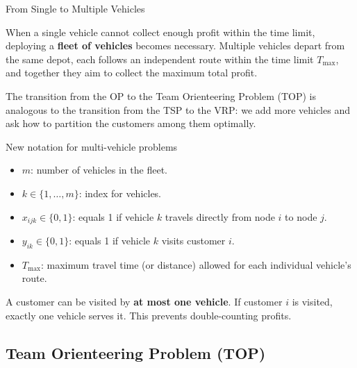 \documentclass[aspectratio=169,10pt]{beamer}
\begin{document}
\begin{frame}[allowframebreaks]{From Single to Multiple Vehicles}

  When a single vehicle cannot collect enough profit within the time limit,
  deploying a \textbf{fleet of vehicles} becomes necessary.
  Multiple vehicles depart from the same depot, each follows an
  independent route within the time limit $T_{\max}$, and together
  they aim to collect the maximum total profit.

  \medskip
  The transition from the OP to the Team Orienteering Problem (TOP)
  is analogous to the transition from the TSP to the VRP:
  we add more vehicles and ask how to partition the customers among them
  optimally.

  \medskip
  \begin{block}{New notation for multi-vehicle problems}
    \begin{itemize}
      \item $m$: number of vehicles in the fleet.
      \item $k \in \{1, \ldots, m\}$: index for vehicles.
      \item $x_{ijk} \in \{0,1\}$: equals 1 if vehicle $k$ travels
            directly from node $i$ to node $j$.
      \item $y_{ik} \in \{0,1\}$: equals 1 if vehicle $k$ visits
            customer $i$.
      \item $T_{\max}$: maximum travel time (or distance) allowed
            for each individual vehicle's route.
    \end{itemize}
  \end{block}

  \medskip
  A customer can be visited by \textbf{at most one vehicle}.
  If customer $i$ is visited, exactly one vehicle serves it.
  This prevents double-counting profits.

\end{frame}

\subsection{Team Orienteering Problem (TOP)}
\end{document}
